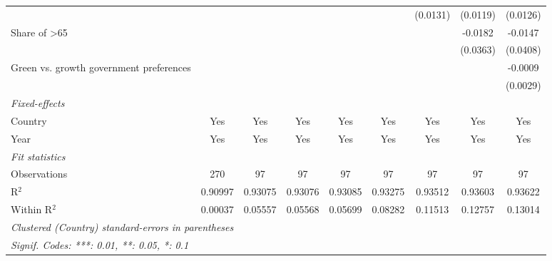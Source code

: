 \begin{table}[htbp]
\begin{tabular}{lcccccccc}
                                              &          &          &          &          &          & (0.0131) & (0.0119)               & (0.0126)\\   
      Share of >65                            &          &          &          &          &          &          & -0.0182                & -0.0147\\   
                                              &          &          &          &          &          &          & (0.0363)               & (0.0408)\\   
      Green vs. growth government preferences &          &          &          &          &          &          &                        & -0.0009\\   
                                              &          &          &          &          &          &          &                        & (0.0029)\\   
      \midrule
      \emph{Fixed-effects}\\
      Country                                 & Yes      & Yes      & Yes      & Yes      & Yes      & Yes      & Yes                    & Yes\\  
      Year                                    & Yes      & Yes      & Yes      & Yes      & Yes      & Yes      & Yes                    & Yes\\  
      \midrule
      \emph{Fit statistics}\\
      Observations                            & 270      & 97       & 97       & 97       & 97       & 97       & 97                     & 97\\  
      R$^2$                                   & 0.90997  & 0.93075  & 0.93076  & 0.93085  & 0.93275  & 0.93512  & 0.93603                & 0.93622\\  
      Within R$^2$                            & 0.00037  & 0.05557  & 0.05568  & 0.05699  & 0.08282  & 0.11513  & 0.12757                & 0.13014\\  
      \midrule \midrule
      \multicolumn{9}{l}{\emph{Clustered (Country) standard-errors in parentheses}}\\
      \multicolumn{9}{l}{\emph{Signif. Codes: ***: 0.01, **: 0.05, *: 0.1}}\\
   \end{tabular}
\end{table}


